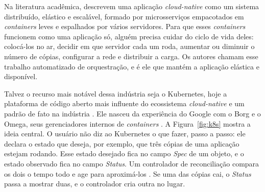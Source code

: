 Na literatura acadêmica,  descrevem uma aplicação \textit{cloud-native} como um sistema distribuído, elástico e escalável, formado por microsserviços empacotados em \textit{containers} leves e espalhados por vários servidores. Para que esses \textit{containers} funcionem como uma aplicação só, alguém precisa cuidar do ciclo de vida deles: colocá-los no ar, decidir em que servidor cada um roda, aumentar ou diminuir o número de cópias, configurar a rede e distribuir a carga. Os autores chamam esse trabalho automatizado de orquestração, e é ele que mantém a aplicação elástica e disponível.

Talvez o recurso mais notável dessa indústria seja o Kubernetes, hoje a plataforma de código aberto mais influente do ecossistema \textit{cloud-native} e um padrão de fato na indústria \cite{Shuiguang2023}. Ele nasceu da experiência do Google com o Borg e o Omega, seus gerenciadores internos de \textit{containers} \cite{Burns2016}. A Figura~\ref{fig:k8s} mostra a ideia central. O usuário não diz ao Kubernetes o que fazer, passo a passo: ele declara o estado que deseja, por exemplo, que três cópias de uma aplicação estejam rodando. Esse estado desejado fica no campo \textit{Spec} de um objeto, e o estado observado fica no campo \textit{Status}. Um controlador de reconciliação compara os dois o tempo todo e age para aproximá-los \cite{Burns2016}. Se uma das cópias cai, o \textit{Status} passa a mostrar duas, e o controlador cria outra no lugar.

